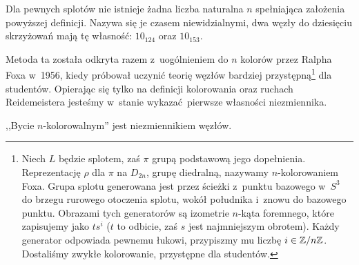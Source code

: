 Dla pewnych splotów nie istnieje żadna liczba naturalna $n$ spełniająca założenia powyższej definicji.
Nazywa się je czasem niewidzialnymi, dwa węzły do dziesięciu skrzyżowań mają tę własność: $10_{124}$ oraz $10_{153}$.

Metoda ta została odkryta razem z~uogólnieniem do $n$ kolorów przez Ralpha Foxa w~1956, kiedy próbował uczynić teorię węzłów bardziej przystępną\footnote{
    Niech $L$ będzie splotem, zaś $\pi$ grupą podstawową jego dopełnienia.
    Reprezentację $\rho$ dla $\pi$ na $D_{2n}$, grupę diedralną, nazywamy $n$-kolorowaniem Foxa.
    Grupa splotu generowana jest przez ścieżki z~punktu bazowego w~$S^3$ do brzegu rurowego otoczenia splotu, wokół południka i~znowu do bazowego punktu.
    Obrazami tych generatorów są izometrie $n$-kąta foremnego, które zapisujemy jako $ts^i$ ($t$ to odbicie, zaś $s$ jest najmniejszym obrotem).
    Każdy generator odpowiada pewnemu łukowi, przypiszmy mu liczbę $i \in \mathbb Z/n\mathbb Z$.
    Dostaliśmy zwykłe kolorowanie, przystępne dla studentów.
}
dla studentów.
Opierając się tylko na definicji kolorowania oraz ruchach Reidemeistera jesteśmy w~stanie wykazać pierwsze własności niezmiennika.

\begin{proposition} \label{color_invariant}
    ,,Bycie $n$-kolorowalnym'' jest niezmiennikiem węzłów.
\end{proposition}

